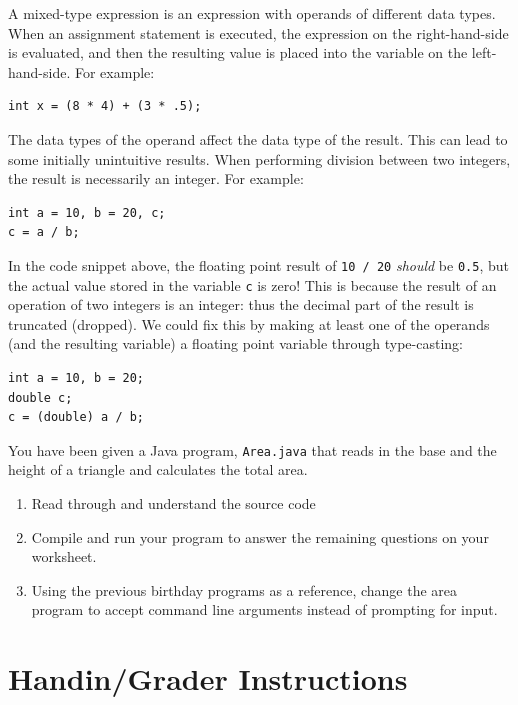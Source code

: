 \documentclass[12pt]{scrartcl}
\begin{document}
A mixed-type expression is an expression with operands of different 
data types. When an assignment statement is executed, the expression 
on the right-hand-side is evaluated, and then the resulting value is 
placed into the variable on the left-hand-side.  For example:

\begin{verbatim}
int x = (8 * 4) + (3 * .5);
\end{verbatim}

The data types of the operand affect the data type of the result.  This 
can lead to some initially unintuitive results.  When performing division 
between two integers, the result is necessarily an integer.  For example:

\begin{verbatim}
int a = 10, b = 20, c;
c = a / b;
\end{verbatim}

In the code snippet above, the floating point result of \texttt{10 / 20} 
\emph{should} be \texttt{0.5}, but the actual value stored in the 
variable \texttt{c} is zero!  This is because the result of an operation 
of two integers is an integer: thus the decimal part of the result is truncated 
(dropped).  We could fix this by making at least one of the operands (and 
the resulting variable) a floating point variable through type-casting:

\begin{verbatim}
int a = 10, b = 20;
double c;
c = (double) a / b;
\end{verbatim}

You have been given a Java program, \texttt{Area.java} that reads 
in the base and the height of a triangle and calculates the total area.

\begin{enumerate}
  \item Read through and understand the source code
  \item Compile and run your program to answer the remaining questions 
  	on your worksheet.
  \item Using the previous birthday programs as a reference, change the
  	area program to accept command line arguments instead of prompting
	for input.
\end{enumerate}  

\section{Handin/Grader Instructions}
\end{document}
